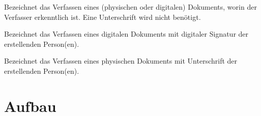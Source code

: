 \documentclass[%
    parskip=half,
]{scrartcl}
\begin{document}

Bezeichnet das Verfassen eines (physischen oder digitalen) Dokuments, worin der Verfasser erkenntlich ist. Eine
Unterschrift wird nicht benötigt.


Bezeichnet das Verfassen eines digitalen Dokuments mit digitaler Signatur der erstellenden Person(en).


Bezeichnet das Verfassen eines physischen Dokuments mit Unterschrift der erstellenden Person(en).

\clearpage

\appendix

\section{Aufbau}
\end{document}
